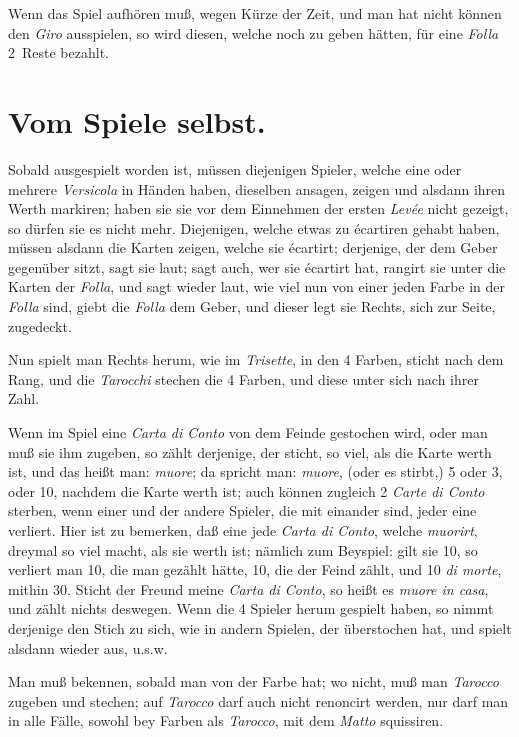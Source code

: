 \documentclass[11pt,a6paper,twoside]{article}
\begin{document}
Wenn das Spiel aufhören muß, wegen Kürze der Zeit, und man hat nicht können den \textit{Giro} ausspielen, so wird diesen, welche noch zu geben hätten, für eine \textit{Folla} 2~Reste bezahlt.


\section{Vom Spiele selbst.}

Sobald ausgespielt worden ist, müssen diejenigen Spieler, welche eine oder mehrere \textit{Versicola} in Händen haben, dieselben ansagen, zeigen und alsdann ihren Werth markiren; haben sie sie vor dem Einnehmen der ersten \textit{Levée} nicht gezeigt, so dürfen sie es nicht mehr. Diejenigen, welche etwas zu écartiren gehabt haben, müssen alsdann die Karten zeigen, welche sie écartirt; derjenige, der dem Geber gegenüber sitzt, sagt sie laut; sagt auch, wer sie écartirt hat, rangirt sie unter die Karten der \textit{Folla}, und sagt wieder laut, wie viel nun von einer jeden Farbe in der \textit{Folla} sind, giebt die \textit{Folla} dem Geber, und dieser legt sie Rechts, sich zur Seite, zugedeckt.

Nun spielt man Rechts herum, wie im \textit{Trisette}, in den 4 Farben, sticht nach dem Rang, und die \textit{Tarocchi} stechen die 4 Farben, und diese unter sich nach ihrer Zahl.

Wenn im Spiel eine \textit{Carta di Conto} von dem Feinde gestochen wird, oder man muß sie ihm zugeben, so zählt derjenige, der sticht, so viel, als die Karte werth ist, und das heißt man: \textit{muore}; da spricht man: \textit{muore}, (oder es stirbt,) 5 oder 3, oder 10, nachdem die Karte werth ist; auch können zugleich 2 \textit{Carte di Conto} sterben, wenn einer und der andere Spieler, die mit einander sind, jeder eine verliert. Hier ist zu bemerken, daß eine jede \textit{Carta di Conto}, welche \textit{muorirt}, dreymal so viel macht, als sie werth ist; nämlich zum Beyspiel: gilt sie 10, so verliert man 10, die man gezählt hätte, 10, die der Feind zählt, und 10 \textit{di morte}, mithin 30. Sticht der Freund meine \textit{Carta di Conto}, so heißt es \textit{muore in casa}, und zählt nichts deswegen. Wenn die 4 Spieler herum gespielt haben, so nimmt derjenige den Stich zu sich, wie in andern Spielen, der überstochen hat, und spielt alsdann wieder aus, u.s.w.

Man muß bekennen, sobald man von der Farbe hat; wo nicht, muß man \textit{Tarocco} zugeben und stechen; auf \textit{Tarocco} darf auch nicht renoncirt werden, nur darf man in alle Fälle, sowohl bey Farben als \textit{Tarocco}, mit dem \textit{Matto} squissiren.
\end{document}
